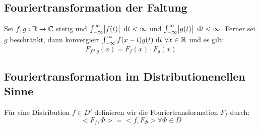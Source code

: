 \subsection{Fouriertransformation der Faltung}
Sei $f,g: \mathbb{R} \to \mathbb{C}$ stetig und $\int_{-\infty}^\infty \abs{f(t)} \text{ d}t < \infty$ und 
$\int_{-\infty}^\infty \abs{g(t)} \text{ d}t < \infty$. Ferner sei $g$ beschränkt, dann konvergiert
$\int_{-\infty}^\infty f(x-t)g(t) \text{ d}t\ \forall x \in \mathbb{R}$ und es gilt: 
\begin{equation*}
    F_{f*g}(x) = F_f(x) \cdot F_g(x)
\end{equation*}

\subsection{Fouriertransformation im Distributionenellen Sinne}
Für eine Distribution $f \in D'$ definieren wir die Fouriertransformation $F_f$ durch:
\begin{equation*}
    <F_f, \Phi> = <f, F_\Phi> \forall \Phi \in D
\end{equation*}
